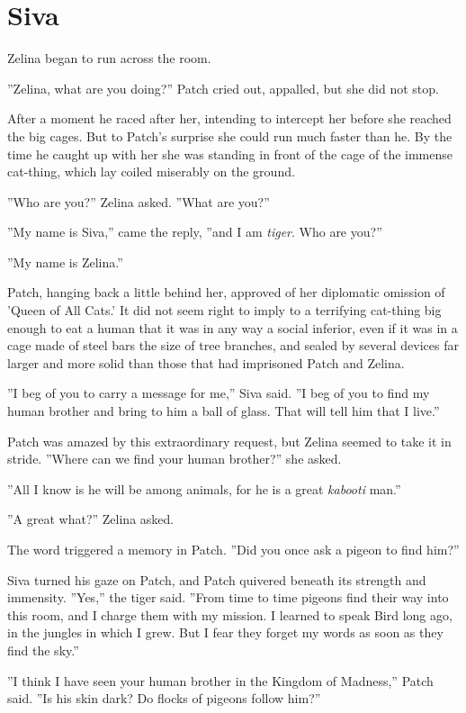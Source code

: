 \documentclass[12pt]{book}
\begin{document}

\section{Siva}

Zelina began to run across the room.

''Zelina, what are you doing?'' Patch cried out, appalled, but she did not stop.

After a moment he raced after her, intending to intercept her before she reached the big cages. But to Patch's surprise she could run much faster than he. By the time he caught up with her she was standing in front of the cage of the immense cat-thing, which lay coiled miserably on the ground.

''Who are you?'' Zelina asked. ''What are you?''

''My name is Siva,'' came the reply, ''and I am {\it tiger}. Who are you?''

''My name is Zelina.''

Patch, hanging back a little behind her, approved of her diplomatic omission of 'Queen of All Cats.' It did not seem right to imply to a terrifying cat-thing big enough to eat a human that it was in any way a social inferior, even if it was in a cage made of steel bars the size of tree branches, and sealed by several devices far larger and more solid than those that had imprisoned Patch and Zelina.

''I beg of you to carry a message for me,'' Siva said. ''I beg of you to find my human brother and bring to him a ball of glass. That will tell him that I live.''

Patch was amazed by this extraordinary request, but Zelina seemed to take it in stride. ''Where can we find your human brother?'' she asked.

''All I know is he will be among animals, for he is a great {\it kabooti} man.''

''A great what?'' Zelina asked.

The word triggered a memory in Patch. ''Did you once ask a pigeon to find him?''

Siva turned his gaze on Patch, and Patch quivered beneath its strength and immensity. ''Yes,'' the tiger said. ''From time to time pigeons find their way into this room, and I charge them with my mission. I learned to speak Bird long ago, in the jungles in which I grew. But I fear they forget my words as soon as they find the sky.''

''I think I have seen your human brother in the Kingdom of Madness,'' Patch said. ''Is his skin dark? Do flocks of pigeons follow him?''
\end{document}
